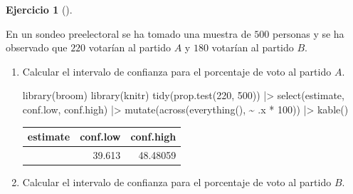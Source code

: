 \documentclass[
  a4paper,
]{scrreport}
\newenvironment{Shaded}{\begin{snugshade}}{\end{snugshade}}
\newcommand{\DecValTok}[1]{\textcolor[rgb]{0.68,0.00,0.00}{#1}}
\newcommand{\FunctionTok}[1]{\textcolor[rgb]{0.28,0.35,0.67}{#1}}
\newcommand{\NormalTok}[1]{\textcolor[rgb]{0.00,0.23,0.31}{#1}}
\newcommand{\SpecialCharTok}[1]{\textcolor[rgb]{0.37,0.37,0.37}{#1}}
\theoremstyle{definition}
\newtheorem{exercise}{Ejercicio}[chapter]
\theoremstyle{remark}
\begin{document}
\begin{exercise}[]\protect\hypertarget{exr-intencion-voto}{}\label{exr-intencion-voto}

En un sondeo preelectoral se ha tomado una muestra de \(500\) personas y
se ha observado que \(220\) votarían al partido \(A\) y \(180\) votarían
al partido \(B\).

\begin{enumerate}
\def\labelenumi{\alph{enumi}.}
\item
  Calcular el intervalo de confianza para el porcentaje de voto al
  partido \(A\).

  \begin{tcolorbox}[enhanced jigsaw, breakable, toptitle=1mm, colbacktitle=quarto-callout-tip-color!10!white, rightrule=.15mm, opacityback=0, opacitybacktitle=0.6, titlerule=0mm, coltitle=black, colframe=quarto-callout-tip-color-frame, colback=white, bottomtitle=1mm, leftrule=.75mm, toprule=.15mm, title=\textcolor{quarto-callout-tip-color}{\faLightbulb}\hspace{0.5em}{Solución}, arc=.35mm, bottomrule=.15mm, left=2mm]

\begin{Shaded}
\begin{Highlighting}[]
\FunctionTok{library}\NormalTok{(broom)}
\FunctionTok{library}\NormalTok{(knitr)}
\FunctionTok{tidy}\NormalTok{(}\FunctionTok{prop.test}\NormalTok{(}\DecValTok{220}\NormalTok{, }\DecValTok{500}\NormalTok{)) }\SpecialCharTok{|\textgreater{}} 
\FunctionTok{select}\NormalTok{(estimate, conf.low, conf.high) }\SpecialCharTok{|\textgreater{}} 
\FunctionTok{mutate}\NormalTok{(}\FunctionTok{across}\NormalTok{(}\FunctionTok{everything}\NormalTok{(), }\SpecialCharTok{\textasciitilde{}}\NormalTok{ .x }\SpecialCharTok{*} \DecValTok{100}\NormalTok{)) }\SpecialCharTok{|\textgreater{}} 
\FunctionTok{kable}\NormalTok{()}
\end{Highlighting}
\end{Shaded}

  \begin{longtable}[]{@{}rrr@{}}
  \toprule\noalign{}
  estimate & conf.low & conf.high \\
  \midrule\noalign{}
  \endhead
  \bottomrule\noalign{}
  \endlastfoot
  44 & 39.613 & 48.48059 \\
  \end{longtable}

  \end{tcolorbox}
\item
  Calcular el intervalo de confianza para el porcentaje de voto al
  partido \(B\).


\end{enumerate}
\end{exercise}
\end{document}

